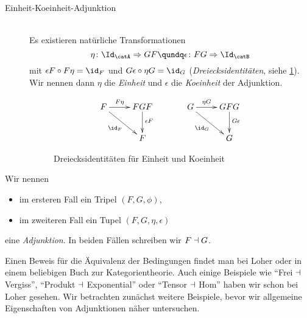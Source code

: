\begin{thErinnerDef}
\begin{description}
        \item[Einheit-Koeinheit-Adjunktion]\hfill\\
            Es existieren natürliche Transformationen
            \[  \eta\colon \Id_\catA \nattrafoto GF  \qundq
                \epsilon\colon FG \nattrafoto \Id_\catB 
             \]
            mit $\epsilon F \after F\eta = \id_F$ und 
            $G\epsilon \after \eta G = \id_G$ (\emph{Dreiecksidentitäten}, siehe
            \cref{ch1:fig:dreiecksid}). Wir nennen dann $\eta$ die
            \emph{Einheit} und $\epsilon$ die \emph{Koeinheit} der Adjunktion.
            \begin{figure}
                \begin{equation*}
                    \begin{gathered} %
                        \xymatrix{
                            F \ar[r]^-{F\eta} \ar[dr]_-{\id_F} 
                            & FGF \ar[d]^(.43){\epsilon F}
                            \\ & F
                        }
                    \end{gathered}
                    \hspace{1.2cm}
                    \begin{gathered}
                        \xymatrix{
                            G \ar[r]^-{\eta G} \ar[dr]_-{\id_G} 
                            & GFG \ar[d]^(.43){G\epsilon}
                            \\ & G
                        }
                    \end{gathered}
                \end{equation*}
                \caption{Dreiecksidentitäten für Einheit und Koeinheit}
                \label{ch1:fig:dreiecksid}
            \end{figure}
    \end{description}
    
    \noindent
    Wir nennen
    \begin{itemize}
        \item 
            im ersteren Fall ein Tripel $(F,G,\phi)$,
        \item
            im zweiteren Fall ein Tupel $(F,G,\eta,\epsilon)$
    \end{itemize}
    eine \emph{Adjunktion}. In beiden Fällen schreiben wir $F\dashv G$.
\end{thErinnerDef}

Einen Beweis für die Äquivalenz der Bedingungen findet man bei
Loher\cite{talk:loher} oder in einem beliebigen Buch zur Kategorientheorie.
Auch einige Beispiele wie  
\enquote{Frei $\dashv$ Vergiss}, \enquote{Produkt $\dashv$ Exponential}
oder \enquote{Tensor $\dashv$ Hom} haben wir schon bei 
Loher\cite[1.3,,]{talk:loher} gesehen. Wir betrachten zunächst weitere
Beispiele, bevor wir allgemeine Eigenschaften von Adjunktionen näher
untersuchen.

